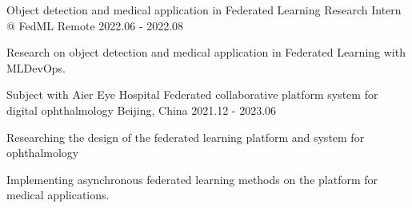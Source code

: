 



\begin{cventries}
\cventry
{Object detection and medical application in Federated Learning} %
{Research Intern @ FedML} %
{Remote} %
{2022.06 - 2022.08} %
{
    \begin{cvitems}
        \item {Research on object detection and medical application in Federated Learning with MLDevOps.}
    \end{cvitems}
}

\cventry
{Subject with Aier Eye Hospital} %
{Federated collaborative platform system for digital ophthalmology} %
{Beijing, China} %
{2021.12 - 2023.06} %
{
    \begin{cvitems}
        \item {Researching the design of the federated learning platform and system for ophthalmology}
        \item {Implementing asynchronous federated learning methods on the platform for medical applications.}
    \end{cvitems}
}



\end{cventries}
